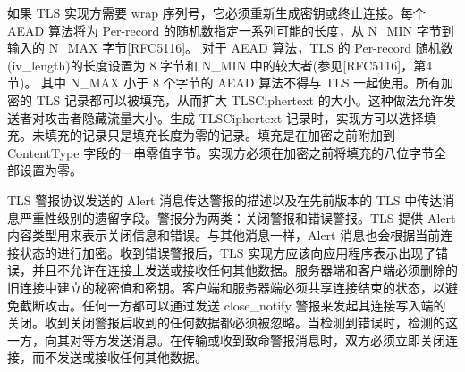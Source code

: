 如果 TLS 实现方需要 wrap 序列号，它必须重新生成密钥或终止连接。每个 AEAD 算法将为 Per-record 的随机数指定一系列可能的长度，从 N\_MIN 字节到输入的 N\_MAX 字节[RFC5116]。 对于 AEAD 算法，TLS 的 Per-record 随机数(iv\_length)的长度设置为 8 字节和 N\_MIN 中的较大者(参见[RFC5116]，第4节)。 其中 N\_MAX 小于 8 个字节的 AEAD 算法不得与 TLS 一起使用。所有加密的 TLS 记录都可以被填充，从而扩大 TLSCiphertext 的大小。这种做法允许发送者对攻击者隐藏流量大小。生成 TLSCiphertext 记录时，实现方可以选择填充。未填充的记录只是填充长度为零的记录。填充是在加密之前附加到 ContentType 字段的一串零值字节。实现方必须在加密之前将填充的八位字节全部设置为零。

TLS 警报协议发送的 Alert 消息传达警报的描述以及在先前版本的 TLS 中传达消息严重性级别的遗留字段。警报分为两类：关闭警报和错误警报。TLS 提供 Alert 内容类型用来表示关闭信息和错误。与其他消息一样，Alert 消息也会根据当前连接状态的进行加密。收到错误警报后，TLS 实现方应该向应用程序表示出现了错误，并且不允许在连接上发送或接收任何其他数据。服务器端和客户端必须删除的旧连接中建立的秘密值和密钥。客户端和服务器端必须共享连接结束的状态，以避免截断攻击。任何一方都可以通过发送 close\_notify 警报来发起其连接写入端的关闭。收到关闭警报后收到的任何数据都必须被忽略。当检测到错误时，检测的这一方，向其对等方发送消息。在传输或收到致命警报消息时，双方必须立即关闭连接，而不发送或接收任何其他数据。